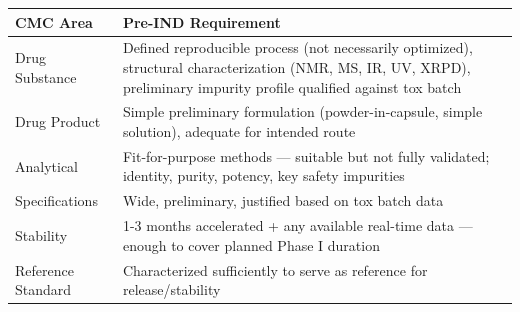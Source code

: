\documentclass[
  11pt,
  a4paper,
]{report}
\begin{document}
\begin{longtable}[]{@{}ll@{}}
\toprule
\begin{minipage}[b]{0.32\columnwidth}\raggedright
CMC Area\strut
\end{minipage} & \begin{minipage}[b]{0.62\columnwidth}\raggedright
Pre-IND Requirement\strut
\end{minipage}\tabularnewline
\midrule
\endhead
\begin{minipage}[t]{0.32\columnwidth}\raggedright
Drug Substance\strut
\end{minipage} & \begin{minipage}[t]{0.62\columnwidth}\raggedright
Defined reproducible process (not necessarily optimized), structural
characterization (NMR, MS, IR, UV, XRPD), preliminary impurity profile
qualified against tox batch\strut
\end{minipage}\tabularnewline
\begin{minipage}[t]{0.32\columnwidth}\raggedright
Drug Product\strut
\end{minipage} & \begin{minipage}[t]{0.62\columnwidth}\raggedright
Simple preliminary formulation (powder-in-capsule, simple solution),
adequate for intended route\strut
\end{minipage}\tabularnewline
\begin{minipage}[t]{0.32\columnwidth}\raggedright
Analytical\strut
\end{minipage} & \begin{minipage}[t]{0.62\columnwidth}\raggedright
Fit-for-purpose methods --- suitable but not fully validated; identity,
purity, potency, key safety impurities\strut
\end{minipage}\tabularnewline
\begin{minipage}[t]{0.32\columnwidth}\raggedright
Specifications\strut
\end{minipage} & \begin{minipage}[t]{0.62\columnwidth}\raggedright
Wide, preliminary, justified based on tox batch data\strut
\end{minipage}\tabularnewline
\begin{minipage}[t]{0.32\columnwidth}\raggedright
Stability\strut
\end{minipage} & \begin{minipage}[t]{0.62\columnwidth}\raggedright
1-3 months accelerated + any available real-time data --- enough to
cover planned Phase I duration\strut
\end{minipage}\tabularnewline
\begin{minipage}[t]{0.32\columnwidth}\raggedright
Reference Standard\strut
\end{minipage} & \begin{minipage}[t]{0.62\columnwidth}\raggedright
Characterized sufficiently to serve as reference for
release/stability\strut
\end{minipage}\tabularnewline
\bottomrule
\end{longtable}
\end{document}
